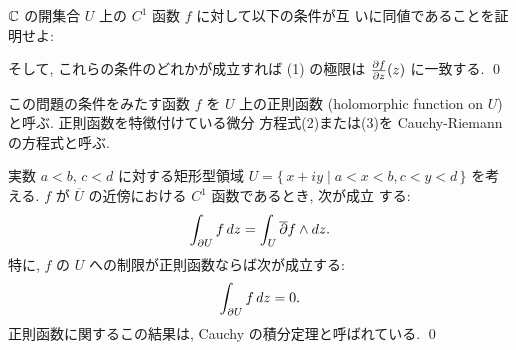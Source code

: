 \documentclass[12pt,twoside]{jarticle}
\begin{document}
\begin{question}\label{q:seisoku-kansu}
  ${\mathbb C}$ の開集合 $U$ 上の $C^1$ 函数 $f$ に対して以下の条件が互
  いに同値であることを証明せよ:
  そして, これらの条件のどれかが成立すれば (1) %
  の極限は $\frac{\partial f}{\partial z}(z)$ に一致する. 
  \qed
\end{question}

\noindent この問題の条件をみたす函数 $f$ を $U$ 上の正則函数
(holomorphic function on $U$)と呼ぶ. 正則函数を特徴付けている微分
方程式(2)または(3)を Cauchy-Riemann の方程式と呼ぶ. 


\begin{question}
  実数 $a < b$, $c < d$ に対する矩形型領域 %
  $U = \{\, x + iy \mid a<x<b, c<y<d\,\}$ を考える. %
  $f$ が $\overline U$ の近傍における $C^1$ 函数であるとき, 次が成立
  する:
  \[
    \int_{\partial U} f\,dz = \int_U  {\overline\partial} f \wedge dz.
  \]%
  特に, $f$ の $U$ への制限が正則函数ならば次が成立する:
  \[
    \int_{\partial U} f\,dz = 0.
  \]%
  正則函数に関するこの結果は, Cauchy の積分定理と呼ばれている.
  \qed
\end{question}
\end{document}
